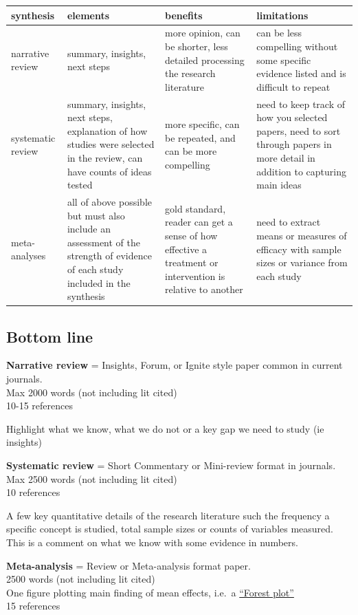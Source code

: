 \documentclass[
]{book}
\begin{document}
\begin{tabular}{llll}
\toprule
synthesis & elements & benefits & limitations\\
\midrule
narrative review & summary, insights, next steps & more opinion, can be shorter, less detailed processing the research literature & can be less compelling without some specific evidence listed and is difficult to repeat\\
systematic review & summary, insights, next steps, explanation of how studies were selected in the review, can have counts of ideas tested & more specific, can be repeated, and can be more compelling & need to keep track of how you selected papers, need to sort through papers in more detail in addition to capturing main ideas\\
meta-analyses & all of above possible but must also include an assessment of the strength of evidence of each study included in the synthesis & gold standard, reader can get a sense of how effective a treatment or intervention is relative to another & need to extract means or measures of efficacy with sample sizes or variance from each study\\
\bottomrule
\end{tabular}

\hypertarget{bottom-line}{%
\subsection*{Bottom line}\label{bottom-line}}

\textbf{Narrative review} = Insights, Forum, or Ignite style paper common in current journals.\\
Max 2000 words (not including lit cited)\\
10-15 references

Highlight what we know, what we do not or a key gap we need to study (ie insights)

\textbf{Systematic review} = Short Commentary or Mini-review format in journals.\\
Max 2500 words (not including lit cited)\\
10 references

A few key quantitative details of the research literature such the frequency a specific concept is studied, total sample sizes or counts of variables measured. This is a comment on what we know with some evidence in numbers.

\textbf{Meta-analysis} = Review or Meta-analysis format paper.\\
2500 words (not including lit cited)\\
One figure plotting main finding of mean effects, i.e.~a \href{https://en.wikipedia.org/wiki/Forest_plot}{``Forest plot''}\\
15 references
\end{document}
